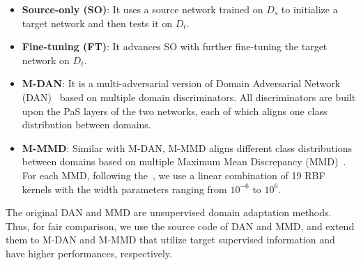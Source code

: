 \documentclass[letterpaper]{article} \usepackage{aaai19}  \usepackage{times}  \usepackage{latexsym}
\begin{document}
\begin{itemize}
\item \textbf{Source-only (SO)}: It uses a source network trained on ${D}_{s}$ to initialize a target network and then tests it on ${D}_{t}$.
\item \textbf{Fine-tuning (FT)}: It advances SO with further fine-tuning the target network on ${D}_{t}$.
\item \textbf{M-DAN}: It is a multi-adversarial version of Domain Adversarial Network (DAN)~\cite{ganin2016domain} based on multiple domain discriminators. All discriminators are built upon the PaS layers of the two networks, each of which aligns one class distribution between domains.
\item \textbf{M-MMD}: Similar with M-DAN, M-MMD aligns different class distributions between domains based on multiple Maximum Mean Discrepancy (MMD)~\cite{gretton2007kernel}. For each MMD, 
following the~\cite{bousmalis2016domain}, 
we use a linear combination of 19 RBF kernels with the width parameters ranging from $10^{-6}$ to $10^{6}$.
\end{itemize}
The original DAN and MMD are unsupervised domain adaptation methods. Thus, for fair comparison, we use the source code of DAN and MMD, and extend them to M-DAN and M-MMD that utilize target supervised information and have higher performances, respectively.
\end{document}
